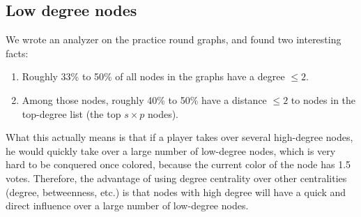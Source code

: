 \documentclass[12pt]{article}
\begin{document}
\subsection{Low degree nodes}
We wrote an analyzer on the practice round graphs, and found two interesting facts:
\begin{enumerate}
\item Roughly 33\% to 50\% of all nodes in the graphs have a degree $\leq 2$. 
\item Among those nodes, roughly 40\% to 50\% have a distance $\leq 2$ to nodes in the top-degree list (the top $s \times p$ nodes). 
\end{enumerate}
What this actually means is that if a player takes over several high-degree nodes, he would quickly take over a large number of low-degree nodes, which is very hard to be conquered once colored, because the current color of the node has 1.5 votes. Therefore, the advantage of using degree centrality over other centralities (degree, betweenness, etc.) is that nodes with high degree will have a quick and direct influence over a large number of low-degree nodes. 
\end{document}
